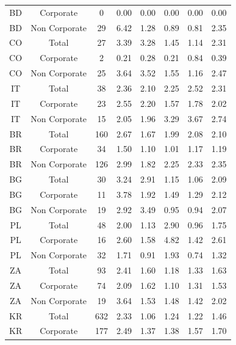 {\begin{table}[ht]
{{\begin{tabular}{cccccccc}
                BD & Corporate & 0 & 0.00 & 0.00 & 0.00 & 0.00 & 0.00\\
                BD & Non Corporate & 29 & 6.42 & 1.28 & 0.89 & 0.81 & 2.35\\
                \midrule
                CO & Total & 27 & 3.39 & 3.28 & 1.45 & 1.14 & 2.31\\ 
                CO & Corporate & 2 & 0.21 & 0.28 & 0.21 & 0.84 & 0.39\\
                CO & Non Corporate & 25 & 3.64 & 3.52 & 1.55 & 1.16 & 2.47\\
                \midrule
                IT & Total & 38 & 2.36 & 2.10 & 2.25 & 2.52 & 2.31\\ 
                IT & Corporate & 23 & 2.55 & 2.20 & 1.57 & 1.78 & 2.02\\
                IT & Non Corporate & 15 & 2.05 & 1.96 & 3.29 & 3.67 & 2.74\\
                \midrule
                BR & Total & 160 & 2.67 & 1.67 & 1.99 & 2.08 & 2.10\\
                BR & Corporate & 34 & 1.50 & 1.10 & 1.01 & 1.17 & 1.19\\
                BR & Non Corporate & 126 & 2.99 & 1.82 & 2.25 & 2.33 & 2.35\\
                \midrule
                BG & Total & 30 & 3.24 & 2.91 & 1.15 & 1.06 & 2.09\\
                BG & Corporate & 11 & 3.78 & 1.92 & 1.49 & 1.29 & 2.12\\
                BG & Non Corporate & 19 & 2.92 & 3.49 & 0.95 & 0.94 & 2.07\\
                \midrule
                PL & Total & 48 & 2.00 & 1.13 & 2.90 & 0.96 & 1.75\\
                PL & Corporate & 16 & 2.60 & 1.58 & 4.82 & 1.42 & 2.61\\
                PL & Non Corporate & 32 & 1.71 & 0.91 & 1.93 & 0.74 & 1.32\\
                \midrule
                ZA & Total & 93 & 2.41 & 1.60 & 1.18 & 1.33 & 1.63\\
                ZA & Corporate & 74 & 2.09 & 1.62 & 1.10 & 1.31 & 1.53\\
                ZA & Non Corporate & 19 & 3.64 & 1.53 & 1.48 & 1.42 & 2.02\\
                \midrule
                KR & Total & 632 & 2.33 & 1.06 & 1.24 & 1.22 & 1.46\\
                KR & Corporate & 177 & 2.49 & 1.37 & 1.38 & 1.57 & 1.70\\

\end{tabular}}}
\end{table}}
